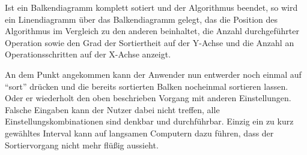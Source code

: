 Ist ein Balkendiagramm komplett sotiert und der Algorithmus beendet, so wird ein Linendiagramm über das Balkendiagramm gelegt, das die Position
des Algorithmus im Vergleich zu den anderen beinhaltet, die Anzahl durchgeführter Operation sowie den Grad der Sortiertheit auf der Y-Achse und
die Anzahl an Operationsschritten auf der X-Achse anzeigt.
 
An dem Punkt angekommen kann der Anwender nun entwerder noch einmal auf "`sort"' drücken und die bereits sortierten Balken
nocheinmal sortieren lassen. Oder er wiederholt den oben beschrieben Vorgang mit anderen Einstellungen.
Falsche Eingaben kann der Nutzer dabei nicht treffen, alle Einstellungskombinationen sind denkbar und durchführbar. Einzig
ein zu kurz gewähltes Interval kann auf langsamen Computern dazu führen, dass der Sortiervorgang nicht mehr flüßig aussieht.


